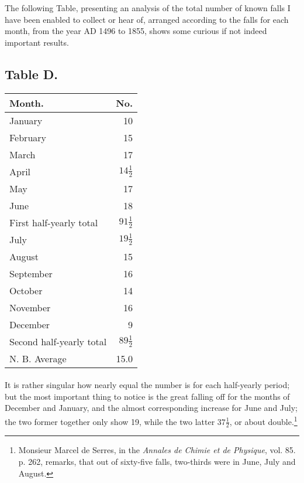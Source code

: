 \documentclass[a4paper, 12pt, oneside]{article}
\begin{document}
The following Table, presenting an analysis of the total number of known falls I have been enabled to collect or hear of, arranged according to the falls for each month, from the year AD 1496 to 1855, shows some curious if not indeed important results.
\subsection{Table D.}
 \begin{table}[H]
    \centering
    \begin{tabular}{|l|r|}
    \hline
        Month. & No. \\ \hline
        January & 10 \\
        February & 15 \\
        March & 17 \\
        April & $14\frac{1}{2}$ \\
        May & 17 \\
        June & 18 \\ \hline
        First half-yearly total & $91\frac{1}{2}$ \\ \hline
        July & $19\frac{1}{2}$ \\
        August & 15 \\
        September & 16 \\
        October & 14 \\
        November & 16 \\
        December & 9 \\ \hline
        Second half-yearly total & $89\frac{1}{2}$ \\ \hline \hline
        N. B. Average & 15.0 \\ \hline
    \end{tabular}
\end{table}
\paragraph{}
It is rather singular how nearly equal the number is for each half-yearly period; but the most important thing to notice is the great falling off for the months of December and January, and the almost corresponding increase for June and July; the two former together only show 19, while the two latter $37\frac{1}{2}$, or about double.\footnote{Monsieur Marcel de Serres, in the \emph{Annales de Chimie et de Physique}, vol. 85. p. 262, remarks, that out of sixty-five falls, two-thirds were in June, July and August.}
\end{document}
